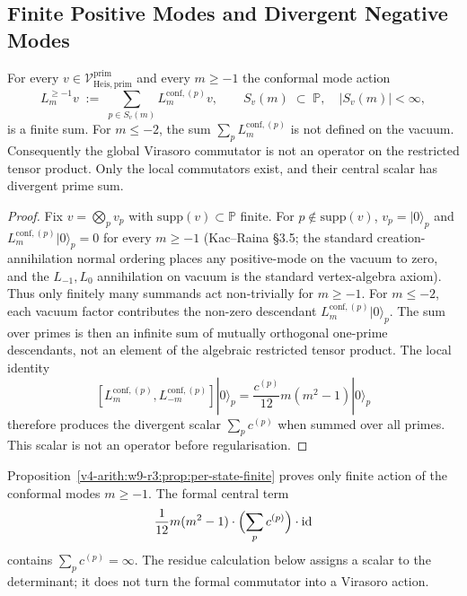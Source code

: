 \subsection{Finite Positive Modes and Divergent Negative Modes}
\label{v4-arith:w9-r3:per-state-finite}

\begin{proposition}
\label{v4-arith:w9-r3:prop:per-state-finite}
For every \(v\in\mathcal{V}^{\mathrm{prim}}_{\mathrm{Heis},\mathrm{prim}}\)
and every \(m\geq -1\) the conformal mode action
\begin{equation}
\label{v4-arith:w9-r3:eq:finite-acting}
L_{m}^{\geq -1}v\;:=\;\sum_{p\in S_{v}(m)}L_{m}^{\mathrm{conf},(p)}v,\qquad S_{v}(m)\;\subset\;\mathbb{P},\quad |S_{v}(m)|<\infty,
\end{equation}
is a finite sum. For \(m\leq -2\), the sum
\(\sum_{p}L_{m}^{\mathrm{conf},(p)}\) is not defined on the vacuum.
Consequently the global Virasoro commutator is not an operator on the
restricted tensor product. Only the local commutators exist, and their
central scalar has divergent prime sum.
\end{proposition}

\begin{proof}
Fix \(v=\bigotimes_{p}v_{p}\) with \(\mathrm{supp}(v)\subset\mathbb{P}\)
finite. For \(p\notin\mathrm{supp}(v)\), \(v_{p}=|0\rangle_{p}\) and
\(L_{m}^{\mathrm{conf},(p)}|0\rangle_{p}=0\) for every \(m\geq-1\)
(Kac--Raina \S 3.5; the standard creation-annihilation normal
ordering places any positive-mode on the vacuum to zero, and the
\(L_{-1},L_{0}\) annihilation on vacuum is the standard vertex-algebra axiom).
Thus only finitely many summands act non-trivially for \(m\geq-1\).
For \(m\leq-2\), each vacuum factor contributes the non-zero descendant
\(L_{m}^{\mathrm{conf},(p)}|0\rangle_{p}\). The sum over primes is then
an infinite sum of mutually orthogonal one-prime descendants, not an
element of the algebraic restricted tensor product. The local identity
\[
[L_{m}^{\mathrm{conf},(p)},L_{-m}^{\mathrm{conf},(p)}]|0\rangle_{p}
=\frac{c^{(p)}}{12}m(m^{2}-1)|0\rangle_{p}
\]
therefore produces the divergent scalar
\(\sum_{p}c^{(p)}\) when summed over all primes. This scalar is not an
operator before regularisation.
\end{proof}

\begin{remark}
\label{v4-arith:w9-r3:rem:central-term-decomposition}
Proposition~\ref{v4-arith:w9-r3:prop:per-state-finite} proves only finite action
of the conformal modes \(m\geq -1\). The formal central term
\begin{equation}
\label{v4-arith:w9-r3:eq:central-term-sum}
\frac{1}{12}m(m^{2}-1)\cdot\Bigl(\sum_{p}c^{(p)}\Bigr)\cdot\mathrm{id}
\end{equation}
contains \(\sum_{p}c^{(p)}=\infty\). The residue calculation below
assigns a scalar to the determinant; it does not turn the formal
commutator into a Virasoro action.
\end{remark}

